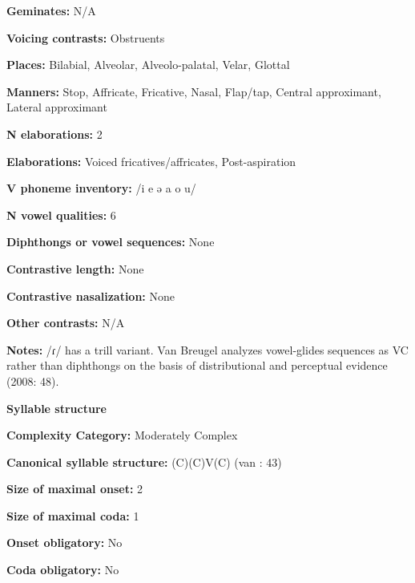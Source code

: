 \textbf{Geminates:} N/A



\textbf{Voicing contrasts:} Obstruents



\textbf{Places:} Bilabial, Alveolar, Alveolo-palatal, Velar, Glottal



\textbf{Manners:} Stop, Affricate, Fricative, Nasal, Flap/tap, Central approximant, Lateral approximant



\textbf{N elaborations:} 2



\textbf{Elaborations:} Voiced fricatives/affricates, Post-aspiration



\textbf{V phoneme inventory:} /i e ə a o u/



\textbf{N vowel qualities:} 6



\textbf{Diphthongs or vowel sequences:} None



\textbf{Contrastive length:} None



\textbf{Contrastive nasalization:} None



\textbf{Other contrasts:} N/A



\textbf{Notes:} /ɾ/ has a trill variant. Van Breugel analyzes vowel-glides sequences as VC rather than diphthongs on the basis of distributional and perceptual evidence (2008: 48).



\textbf{Syllable structure}



\textbf{Complexity Category:} Moderately Complex



\textbf{Canonical syllable structure:} (C)(C)V(C) (van \citealt{Breugel2008}: 43)



\textbf{Size of maximal onset:} 2



\textbf{Size of maximal coda:} 1



\textbf{Onset obligatory:} No



\textbf{Coda obligatory:} No



